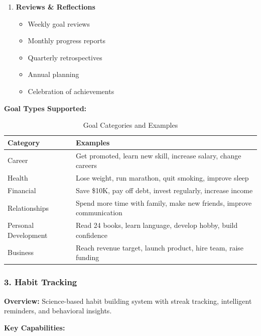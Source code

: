 \begin{enumerate}
    \item \textbf{Reviews \& Reflections}
    \begin{itemize}
        \item Weekly goal reviews
        \item Monthly progress reports
        \item Quarterly retrospectives
        \item Annual planning
        \item Celebration of achievements
    \end{itemize}
\end{enumerate}

\textbf{Goal Types Supported:}

\begin{table}[H]
\centering
\caption{Goal Categories and Examples}
\begin{tabular}{|l|p{10cm}|}
\hline
\rowcolor{lightgray}
\textbf{Category} & \textbf{Examples} \\
\hline
Career & Get promoted, learn new skill, increase salary, change careers \\
\hline
Health & Lose weight, run marathon, quit smoking, improve sleep \\
\hline
Financial & Save \$10K, pay off debt, invest regularly, increase income \\
\hline
Relationships & Spend more time with family, make new friends, improve communication \\
\hline
Personal Development & Read 24 books, learn language, develop hobby, build confidence \\
\hline
Business & Reach revenue target, launch product, hire team, raise funding \\
\hline
\end{tabular}
\end{table}

\subsubsection{3. Habit Tracking}

\textbf{Overview:}
Science-based habit building system with streak tracking, intelligent reminders, and behavioral insights.

\textbf{Key Capabilities:}


